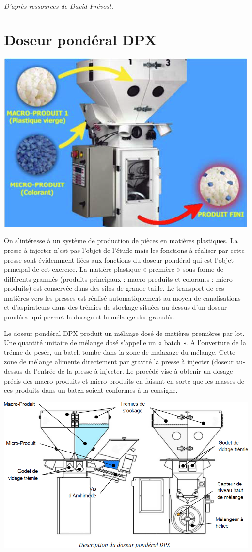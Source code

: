 \documentclass[10pt]{article}
\begin{document}


\begin{flushright}
\textit{D'après ressources de David Prévost.}
\end{flushright}

\section{Doseur pondéral DPX}
\begin{center}
\includegraphics[width=.5\textwidth]{images/fig_01}
\end{center}
On s'intéresse à un système de production de pièces en matières plastiques. La presse à injecter
n’est pas l’objet de l’étude mais les fonctions à réaliser par cette presse sont évidemment liées
aux fonctions du doseur pondéral qui est l’objet principal de cet exercice.
La matière plastique « première » sous forme de différents granulés (produits principaux :
macro produits et colorants : micro produits) est conservée dans des silos de grande taille. Le
transport de ces matières vers les presses est réalisé automatiquement au moyen de
canalisations et d’aspirateurs dans des trémies de stockage situées au-dessus d’un doseur
pondéral qui permet le dosage et le mélange des granulés.

Le doseur pondéral DPX produit un mélange dosé de matières premières par lot. Une quantité
unitaire de mélange dosé s’appelle un « batch ». A l’ouverture de la trémie de pesée, un batch
tombe dans la zone de malaxage du mélange. Cette zone de mélange alimente directement par
gravité la presse à injecter (doseur au-dessus de l’entrée de la presse à injecter. Le procédé vise
à obtenir un dosage précis des macro produits et micro produits en faisant en sorte que les
masses de ces produits dans un batch soient conformes à la consigne.

\begin{center}
\includegraphics[width=.6\textwidth]{images/fig_02}
\end{center}
\end{document}
